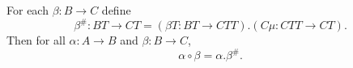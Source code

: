 For each $\beta: B \rightarrow C$ define
$$\beta^{\#}: BT \rightarrow CT = (\beta T: BT \rightarrow CTT).(C\mu: CTT \rightarrow CT).$$
Then for all $\alpha: A \rightarrow B$ and $\beta: B \rightarrow C$,
$$\alpha \circ \beta = \alpha.\beta^{\#}.$$
